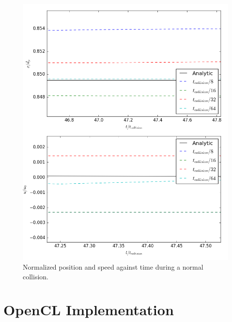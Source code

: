 \documentclass[10pt,a4paper,titlepage]{report}
\begin{document}
\begin{figure}[!htb]
\includegraphics[scale=0.4]{figures/python_verification/friction_verification_zoomed.png}
\caption{Normalized position and speed against time during a normal collision.}
\label{fig:python_friction_verification}
\end{figure}
\chapter{OpenCL Implementation}
\label{ch:OpenCL Implementation}
\end{document}
